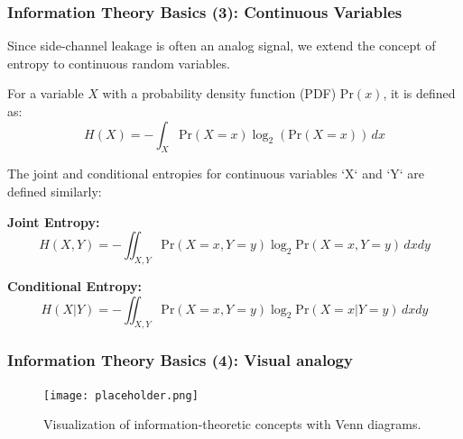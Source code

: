\begin{frame}
    \frametitle{Information Theory Basics (3): Continuous Variables}
    
  
        Since side-channel leakage is often an analog signal, we extend the concept of entropy to continuous random variables. 
        
        For a variable $X$ with a probability density function (PDF) Pr$(x)$, it is defined as:
        $$ H(X) = - \int_{X} \text{Pr}(X=x) \log_2( \text{Pr}(X=x)) \, dx $$
    
        The joint and conditional entropies for continuous variables `X` and `Y` are defined similarly:
        
        \textbf{Joint Entropy:}
        $$ H(X, Y) = - \iint_{X,Y} \text{Pr}(X=x, Y=y) \log_2 \text{Pr}(X=x, Y=y) \, dx dy $$
        
        \textbf{Conditional Entropy:}
        $$ H(X|Y) = - \iint_{X,Y} \text{Pr}(X=x, Y=y) \log_2 \text{Pr}(X=x|Y=y) \, dx dy $$
\end{frame}

\begin{frame}
    \frametitle{Information Theory Basics (4): Visual analogy}
    
    \begin{figure}
        \centering
        \texttt{[image: placeholder.png]} 
        \caption{Visualization of information-theoretic concepts with Venn diagrams.}
    \end{figure}
    
\end{frame}

